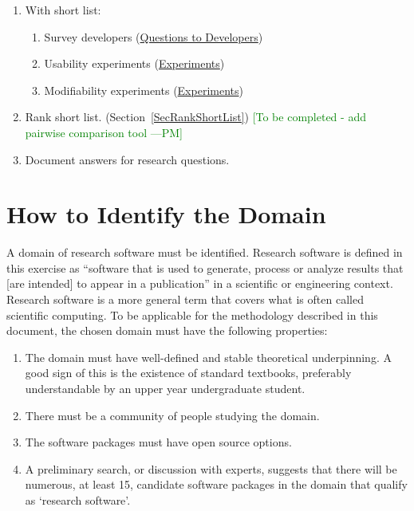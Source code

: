 \documentclass[letterpaper,cleveref]{lipics-v2019}
\newcommand{\authornote}[3]{\textcolor{#1}{[#3 ---#2]}}
\newcommand{\authornote}[3]{}
\newcommand{\wss}[1]{\authornote{blue}{SS}{#1}} %
\newcommand{\pmi}[1]{\authornote{green}{PM}{#1}} %
\theoremstyle{definition}
\begin{document}
\begin{enumerate}
\item With short list:
\begin{enumerate}
\item Survey developers
  (\href{https://github.com/smiths/AIMSS/blob/master/StateOfPractice/Methodology/Questions
    to Developers.pdf}{Questions to Developers})
\item Usability experiments
  (\href{https://github.com/smiths/AIMSS/blob/master/StateOfPractice/Methodology/Experiments.pdf}{Experiments})
\item Modifiability experiments
  (\href{https://github.com/smiths/AIMSS/blob/master/StateOfPractice/Methodology/Experiments.pdf}{Experiments})
\end{enumerate}
\item Rank short list. (Section~\ref{SecRankShortList}) \pmi{To be completed -
    add pairwise comparison tool}
\item Document answers for research questions.
\end{enumerate}


\section{How to Identify the Domain} \label{SecIdentifyDomain} 

A domain of research software must be identified. Research software is defined
in this exercise as ``software that is used to generate, process or analyze
results that [are intended] to appear in a publication'' \citep{hettrick2014uk}
in a scientific or engineering context.  Research software is a more general
term that covers what is often called scientific computing.  To be applicable
for the methodology described in this document, the chosen domain must have the
following properties:

\begin{enumerate}
\item The domain must have well-defined and stable theoretical underpinning.  A
  good sign of this is the existence of standard textbooks, preferably
  understandable by an upper year undergraduate student.
\item There must be a community of people studying the domain.
\item The software packages must have open source options.
\item A preliminary search, or discussion with experts, suggests that there will
  be numerous, at least 15, candidate software packages in the domain that
  qualify as `research software'.
\end{enumerate}	
\end{document}
